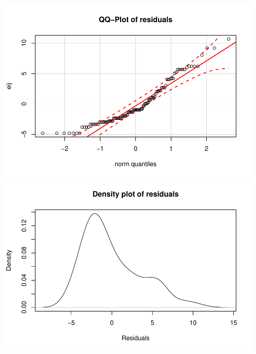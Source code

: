 \documentclass[]{book}
\theoremstyle{definition}
\theoremstyle{definition}
\theoremstyle{remark}
\begin{document}
\includegraphics{03-oneWayAnova_files/figure-latex/Figure3-11-1.pdf}
\includegraphics{03-oneWayAnova_files/figure-latex/Figure3-11-2.pdf}
\end{document}
